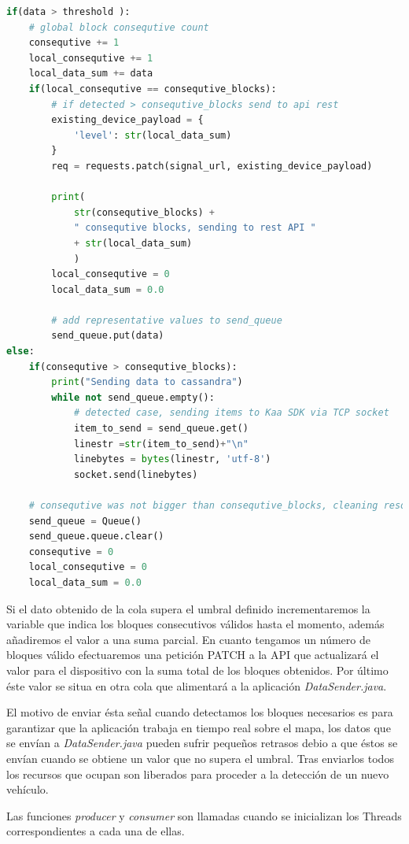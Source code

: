 \begin{lstlisting}[language=python,caption={Hebra consumidora},label={lst:pi1}]
if(data > threshold ):
	# global block consequtive count
	consequtive += 1
	local_consequtive += 1
	local_data_sum += data
	if(local_consequtive == consequtive_blocks):
		# if detected > consequtive_blocks send to api rest
		existing_device_payload = {
			'level': str(local_data_sum)
		}
		req = requests.patch(signal_url, existing_device_payload)

		print(
			str(consequtive_blocks) +
			" consequtive blocks, sending to rest API "
			+ str(local_data_sum)
			)
		local_consequtive = 0
		local_data_sum = 0.0

		# add representative values to send_queue
		send_queue.put(data)
else:
	if(consequtive > consequtive_blocks):
		print("Sending data to cassandra")
		while not send_queue.empty():
			# detected case, sending items to Kaa SDK via TCP socket
			item_to_send = send_queue.get()
			linestr =str(item_to_send)+"\n"
			linebytes = bytes(linestr, 'utf-8')
			socket.send(linebytes)

	# consequtive was not bigger than consequtive_blocks, cleaning resources
	send_queue = Queue()
	send_queue.queue.clear()
	consequtive = 0
	local_consequtive = 0
	local_data_sum = 0.0
\end{lstlisting}

Si el dato obtenido de la cola supera el umbral definido incrementaremos la variable que indica los bloques consecutivos válidos hasta el momento, además añadiremos el valor a una suma parcial. En cuanto tengamos un número de bloques válido efectuaremos una petición PATCH a la API que actualizará el valor para el dispositivo con la suma total de los bloques obtenidos. Por último éste valor se situa en otra cola que alimentará a la aplicación \textit{DataSender.java}.

El motivo de enviar ésta señal cuando detectamos los bloques necesarios es para garantizar que la aplicación trabaja en tiempo real sobre el mapa, los datos que se envían a \textit{DataSender.java} pueden sufrir pequeños retrasos debio a que éstos se envían cuando se obtiene un valor que no supera el umbral. Tras enviarlos todos los recursos que ocupan son liberados para proceder a la detección de un nuevo vehículo.

\newpage

Las funciones \textit{producer} y \textit{consumer} son llamadas cuando se inicializan los Threads correspondientes a cada una de ellas.

